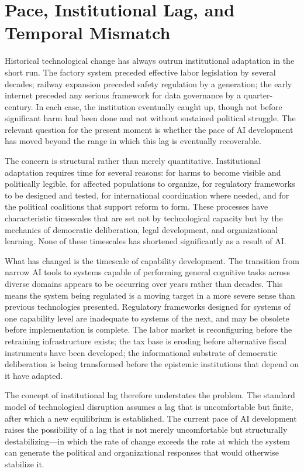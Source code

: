 \documentclass[11pt, a4paper]{article}
\theoremstyle{plain}
\theoremstyle{definition}
\begin{document}
\section{Pace, Institutional Lag, and Temporal Mismatch}

Historical technological change has always outrun institutional adaptation in
the short run. The factory system preceded effective labor legislation by
several decades; railway expansion preceded safety regulation by a generation;
the early internet preceded any serious framework for data governance by a
quarter-century. In each case, the institution eventually caught up, though
not before significant harm had been done and not without sustained political
struggle. The relevant question for the present moment is whether the pace of
AI development has moved beyond the range in which this lag is eventually
recoverable.

The concern is structural rather than merely quantitative. Institutional
adaptation requires time for several reasons: for harms to become visible and
politically legible, for affected populations to organize, for regulatory
frameworks to be designed and tested, for international coordination where
needed, and for the political coalitions that support reform to form. These
processes have characteristic timescales that are set not by technological
capacity but by the mechanics of democratic deliberation, legal development,
and organizational learning. None of these timescales has shortened
significantly as a result of AI.

What has changed is the timescale of capability development. The transition
from narrow AI tools to systems capable of performing general cognitive tasks
across diverse domains appears to be occurring over years rather than decades.
This means the system being regulated is a moving target in a more severe
sense than previous technologies presented. Regulatory frameworks designed
for systems of one capability level are inadequate to systems of the next,
and may be obsolete before implementation is complete. The labor market is
reconfiguring before the retraining infrastructure exists; the tax base is
eroding before alternative fiscal instruments have been developed; the
informational substrate of democratic deliberation is being transformed before
the epistemic institutions that depend on it have adapted.

The concept of institutional lag therefore understates the problem. The
standard model of technological disruption assumes a lag that is uncomfortable
but finite, after which a new equilibrium is established. The current pace of
AI development raises the possibility of a lag that is not merely uncomfortable
but structurally destabilizing---in which the rate of change exceeds the rate
at which the system can generate the political and organizational responses
that would otherwise stabilize it.
\end{document}
